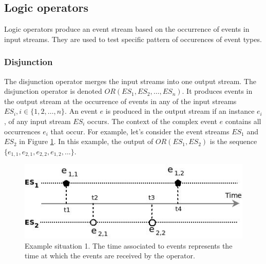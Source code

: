  \subsection{Logic operators}
 Logic operators produce an event stream based on the occurrence of events in input streams. They are used to test specific pattern of occurences of event types.
 
 \subsubsection{Disjunction}
 The disjunction operator merges the input streams into one output stream. The disjunction operator is denoted $OR(ES_1, ES_2, …, ES_n)$. It produces events in the output stream at the occurrence of events in any of the input streams $ES_i, i \in \{1, 2, …,n\}$. An event $e$ is produced in the output stream if an instance $e_i$, of any input stream $ES_i$ occurs. The context of the complex event $e$ contains all occurrences $e_i$ that occur. 
For example, let's consider the event streams $ES_1$ and $ES_2$ in Figure \ref{fig:op_or_exple}.
In this example, the output of $OR(ES_1, ES_2)$ is the sequence $\{e_{1,1}, e_{2,1}, e_{2,2}, e_{1,2}, ...\}$.
\begin{figure}[h]
  \begin{center}
    \includegraphics[scale=0.65]{chap3/images/orExample.jpeg}
  \end{center}
  \caption{Example situation 1. The time associated to events represents the time at which the events are received by the operator.}
  \label{fig:op_or_exple}
\end{figure}

